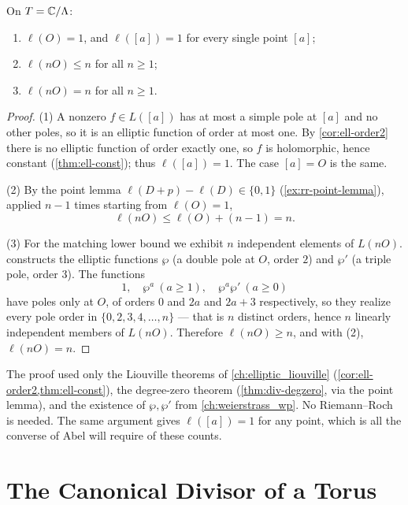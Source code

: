 \begin{proposition}
\label{prop:rr-counts}
On \(T = \mathbb{C}/\Lambda\):
\begin{enumerate}
\item \(\ell(O) = 1\), and \(\ell([a]) = 1\) for every single point \([a]\);
\item \(\ell(nO) \le n\) for all \(n \ge 1\);
\item \(\ell(nO) = n\) for all \(n \ge 1\).
\end{enumerate}
\end{proposition}

\begin{proof}
(1) A nonzero \(f \in L([a])\) has at most a simple pole at \([a]\) and no other
poles, so it is an elliptic function of order at most one. By
\cref{cor:ell-order2} there is no elliptic function of order exactly one, so \(f\)
is holomorphic, hence constant (\cref{thm:ell-const}); thus \(\ell([a]) = 1\).
The case \([a] = O\) is the same.

(2) By the point lemma \(\ell(D + p) - \ell(D) \in \{0,1\}\)
(\cref{ex:rr-point-lemma}), applied \(n-1\) times starting from \(\ell(O) = 1\),
\[
  \ell(nO) \le \ell(O) + (n-1) = n .
\]

(3) For the matching lower bound we exhibit \(n\) independent elements of
\(L(nO)\).  constructs the elliptic functions \(\wp\)
(a double pole at \(O\), order \(2\)) and \(\wp'\) (a triple pole, order \(3\)).
The functions
\[
  1, \quad \wp^{a}\ (a \ge 1),\quad \wp^{a}\wp'\ (a \ge 0)
\]
have poles only at \(O\), of orders \(0\) and \(2a\) and \(2a+3\) respectively, so
they realize every pole order in \(\{0, 2, 3, 4, \dots, n\}\) --- that is \(n\)
distinct orders, hence \(n\) linearly independent members of \(L(nO)\). Therefore
\(\ell(nO) \ge n\), and with (2), \(\ell(nO) = n\).
\end{proof}

\begin{remark}
\label{rem:rr-elementary}
The proof used only the Liouville theorems of \cref{ch:elliptic_liouville}
(\cref{cor:ell-order2,thm:ell-const}), the degree-zero theorem
(\cref{thm:div-degzero}, via the point lemma), and the existence of \(\wp, \wp'\)
from \cref{ch:weierstrass_wp}. No Riemann--Roch is needed. The same argument gives
\(\ell([a]) = 1\) for any point, which is all the converse of Abel will require of
these counts.
\end{remark}

\section{The Canonical Divisor of a Torus}
\label{sec:rr-canonical}

